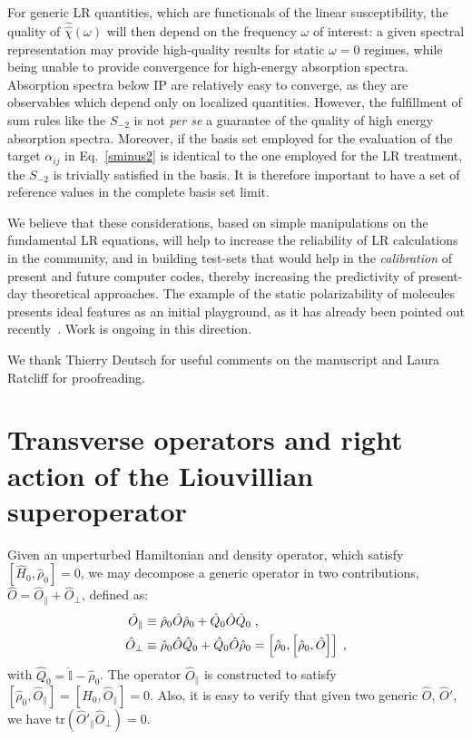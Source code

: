 \documentclass[reprint,aps,prb]{revtex4-1}
\newcommand{\nn}{\notag}
\newcommand{\lb}{\label}
\newcommand{\op}[1]{\hat {#1}}
\newcommand{\sop}[1]{\op{\op {#1}}}
\newcommand{\commutator}[2]{\left[ {#1} , {#2} \right]}
\newcommand{\trace}[1]{\mathrm{tr}\left(#1\right)}
\newcommand{\dmnot}{\op{\rho}_0}
\newcommand{\hnot}{\op{H}_0}
\newcommand{\identity}{\op{\mathbb I}}
\begin{document}
For generic LR quantities, which are functionals of the linear susceptibility, the quality of $\sop \chi(\omega)$ will then depend
on the frequency $\omega$ of interest: a given spectral representation may provide high-quality results for static $\omega=0$ regimes, while being
unable to provide convergence for high-energy absorption spectra.
Absorption spectra below IP are relatively easy to converge, as they are observables which depend only on localized quantities.
However, the fulfillment of sum rules like the $S_{-2}$ is not \textit{per se}
a guarantee of the quality of high energy absorption spectra.
Moreover, if the basis set employed for the evaluation of the target $\alpha_{ij}$ in  Eq.~\eqref{sminus2} is identical to the one employed for the LR treatment, the $S_{-2}$
is trivially satisfied in the basis. It is therefore important to have a set of reference values
in the complete basis set limit.

We believe that these considerations, based on simple manipulations on the fundamental LR equations, will help to increase the reliability of LR
calculations in the community, and in building test-sets that would help in the \emph{calibration} of present and future computer codes, thereby
increasing the predictivity of present-day theoretical approaches. The example of the static polarizability of molecules
presents ideal features as an initial playground, as it has already been pointed out recently~\cite{HeadGordon}. Work is ongoing in this direction.

\begin{acknowledgments}
We thank Thierry Deutsch for useful comments on the manuscript and Laura Ratcliff for proofreading.
\end{acknowledgments}

\appendix
\section{Transverse operators and right action of the Liouvillian superoperator}\lb{LiouvillianAction}
Given an unperturbed Hamiltonian and density operator, which satisfy $\commutator{\hnot}{\dmnot}=0$, we may decompose a generic operator in two contributions, $\op O=\op O_\parallel + \op O_\perp$, defined as:
\begin{align}
\op O_\parallel &\equiv \dmnot \op O \dmnot + \op Q_0 \op O \op Q_0 \nn \;,\\
\op O_\perp &\equiv \dmnot \op O \op Q_0 +  \op Q_0 \op O \dmnot =
\commutator{\dmnot}{\commutator{\dmnot}{\op O}} \;,
\end{align}
with $\op Q_0 =\identity - \dmnot$.
The operator $\op O_\parallel$ is constructed to satisfy
$\commutator{\dmnot}{\op O_\parallel} = \commutator{\hnot}{\op O_\parallel} =0$.
Also, it is easy to verify that given two generic $\op O$, $\op O'$, we have
$\trace{\op O'_\parallel \op O_\perp} =0$.
\end{document}
